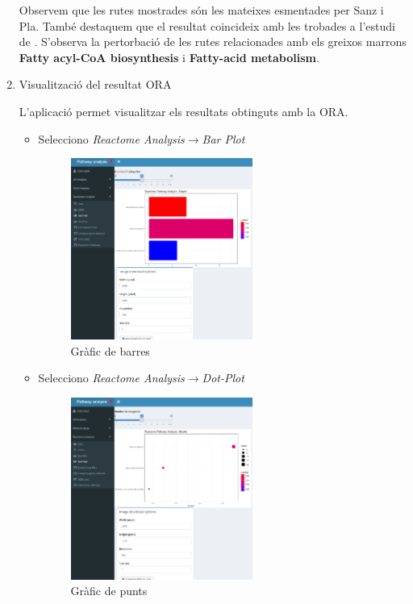 \begin{enumerate}
Observem que les rutes mostrades són les mateixes esmentades per Sanz i Pla. També destaquem que el resultat coincideix amb les trobades a l’estudi de \cite{li2017zbtb7b}. S'observa la pertorbació de les rutes relacionades amb els greixos marrons \textbf{Fatty acyl-CoA biosynthesis} i \textbf{Fatty-acid metabolism}.

\item Visualització del resultat \gls{ORA}

L'aplicació permet visualitzar els resultats obtinguts amb la \gls{ORA}. 

\begin{itemize}
\item Selecciono \textit{Reactome Analysis}$\rightarrow$\textit{Bar Plot}

\begin{figure}[H]
\centering
\includegraphics[width=0.6\textwidth]{figures/Estudi1_Fig4_ORA_BP_RA.png} 
\caption{Gràfic de barres}
\end{figure}

\item Selecciono \textit{Reactome Analysis}$\rightarrow$\textit{\gls{Dot-Plot}}

\begin{figure}[H]
\centering
\includegraphics[width=0.6\textwidth]{figures/Estudi1_Fig5_ORA_Dot_RA.png} 
\caption{Gràfic de punts}
\end{figure}


\end{itemize}
\end{enumerate}
